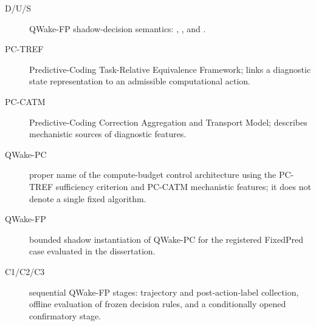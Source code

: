 \begin{description}
  \item[D/U/S] QWake-FP shadow-decision semantics: , , and .
  \item[PC-TREF] Predictive-Coding Task-Relative Equivalence Framework; links a diagnostic state representation to an admissible computational action.
  \item[PC-CATM] Predictive-Coding Correction Aggregation and Transport Model; describes mechanistic sources of diagnostic features.
  \item[QWake-PC] proper name of the compute-budget control architecture using the PC-TREF sufficiency criterion and PC-CATM mechanistic features; it does not denote a single fixed algorithm.
  \item[QWake-FP] bounded shadow instantiation of QWake-PC for the registered FixedPred case evaluated in the dissertation.
  \item[C1/C2/C3] sequential QWake-FP stages: trajectory and post-action-label collection, offline evaluation of frozen decision rules, and a conditionally opened confirmatory stage.
\end{description}

